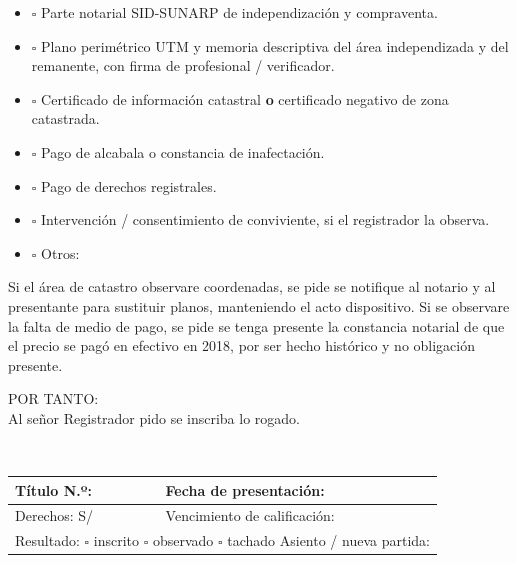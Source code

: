 \documentclass[12pt,a4paper]{article}
\begin{document}
\begin{itemize}[leftmargin=1.15cm]
\item $\square$ Parte notarial SID-SUNARP de independización y compraventa.
\item $\square$ Plano perimétrico UTM y memoria descriptiva del área independizada y del remanente, con firma de profesional / verificador.
\item $\square$ Certificado de información catastral \textbf{o} certificado negativo de zona catastrada.
\item $\square$ Pago de alcabala o constancia de inafectación.
\item $\square$ Pago de derechos registrales.
\item $\square$ Intervención / consentimiento de conviviente, si el registrador la observa.
\item $\square$ Otros: \linea[10.5cm]
\end{itemize}

Si el área de catastro observare coordenadas, se pide se notifique al notario y al presentante para sustituir planos, manteniendo el acto dispositivo. Si se observare la falta de medio de pago, se pide se tenga presente la constancia notarial de que el precio se pagó en efectivo en 2018, por ser hecho histórico y no obligación presente.

\vspace{0.35em}
\noindent POR TANTO:\\
Al señor Registrador pido se inscriba lo rogado.

\LugarFecha

\noindent
{}
\hfill
{}

\vspace{0.8em}
\\
{\small\renewcommand{\arraystretch}{1.55}
\setlength{\tabcolsep}{5pt}
\noindent\begin{tabular}{|p{}|
p{}|}
\hline
Título N.º:\newline\hrulefill & Fecha de presentación:\newline\hrulefill \\
\hline
Derechos: S/\ \hrulefill & Vencimiento de calificación:\newline\hrulefill \\
\hline
\multicolumn{2}{|p{\dimexpr\linewidth-2\tabcolsep-2\arrayrulewidth}|}{%
Resultado: $\square$ inscrito \quad $\square$ observado \quad $\square$ tachado\newline
Asiento / nueva partida: \hrulefill}\\
\hline
\end{tabular}}
\end{document}
